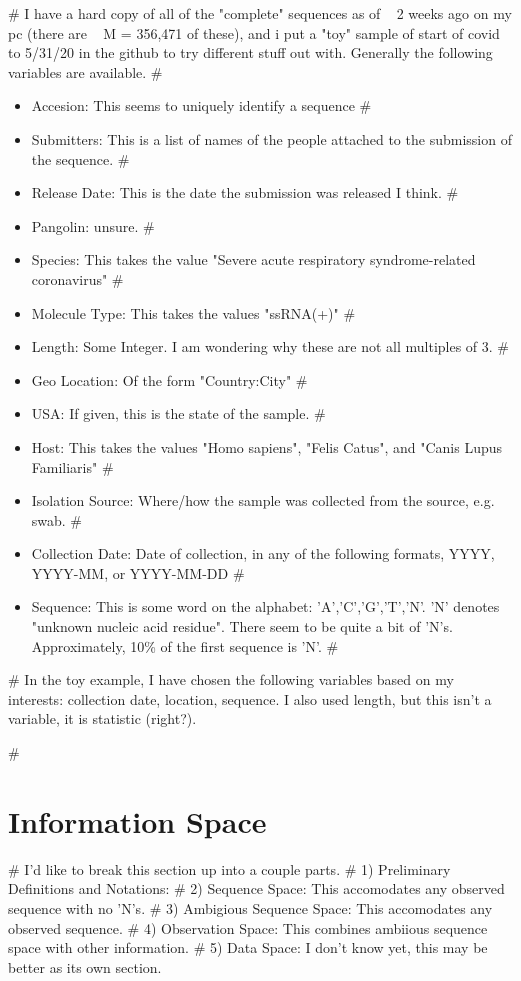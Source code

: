 # I have a hard copy of all of the "complete" sequences as of ~ 2 weeks ago on my pc (there are ~ M = 356,471 of these), and i put a "toy" sample of start of covid to 5/31/20 in the github to try different stuff out with. Generally the following variables are available.
# \begin{itemize}\item Accesion: This seems to uniquely identify a sequence
# \item Submitters: This is a list of names of the people attached to the submission of the sequence.
# \item Release Date: This is the date the submission was released I think.
# \item Pangolin: unsure.
# \item Species: This takes the value "Severe acute respiratory syndrome-related coronavirus"
# \item Molecule Type: This takes the values "ssRNA(+)"
# \item Length: Some Integer. I am wondering why these are not all multiples of 3.
# \item Geo Location: Of the form "Country:City"
# \item USA: If given, this is the state of the sample.
# \item Host: This takes the values "Homo sapiens", "Felis Catus", and "Canis Lupus Familiaris"
# \item Isolation Source: Where/how the sample was collected from the source, e.g. swab.
# \item Collection Date: Date of collection, in any of the following formats, YYYY, YYYY-MM, or YYYY-MM-DD
#\item Sequence: This is some word on the alphabet: 'A','C','G','T','N'. 'N' denotes "unknown nucleic acid residue". There seem to be quite a bit of 'N's. Approximately, 10\% of the first sequence is 'N'.
#\end{itemize}

# In the toy example, I have chosen the following variables based on my interests: collection date, location, sequence. I also used length, but this isn't a variable, it is statistic (right?).

# \section{Information Space}
# I'd like to break this section up into a couple parts.
# 1) Preliminary Definitions and Notations:
# 2) Sequence Space: This accomodates any observed sequence with no 'N's.
# 3) Ambigious Sequence Space: This accomodates any observed sequence.
# 4) Observation Space: This combines ambiious sequence space with other information.
# 5) Data Space: I don't know yet, this may be better as its own section.

